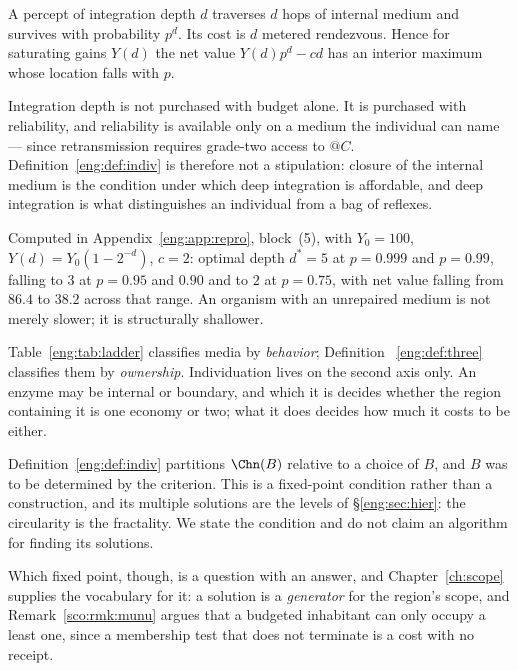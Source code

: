 \begin{proposition}
\label{eng:prop:fragile}
A percept of integration depth $d$ traverses $d$ hops of internal medium
and survives with probability $p^d$. Its cost is $d$ metered rendezvous.
Hence for saturating gains $Y(d)$ the net value $Y(d)p^d - cd$ has an
interior maximum whose location falls with $p$.
\end{proposition}

\begin{corollary}\label{eng:cor:owndepth}
Integration depth is not purchased with budget alone. It is purchased with
reliability, and reliability is available only on a medium the individual
can name --- since retransmission requires grade-two access to $@C$.
Definition~\ref{eng:def:indiv} is therefore not a stipulation: closure of the
internal medium is the condition under which deep integration is
affordable, and deep integration is what distinguishes an individual from a
bag of reflexes.
\end{corollary}

Computed in Appendix~\ref{eng:app:repro}, block~(5), with $Y_0 = 100$,
$Y(d) = Y_0(1-2^{-d})$, $c=2$: optimal depth $d^\ast = 5$ at $p = 0.999$
and $p=0.99$, falling to $3$ at $p = 0.95$ and $0.90$ and to $2$ at
$p = 0.75$, with net value falling from $86.4$ to $38.2$ across that range.
An organism with an unrepaired medium is not merely slower; it is
structurally shallower.

\begin{remark}\label{eng:two-axes}
Table~\ref{eng:tab:ladder} classifies media by \emph{behavior}; Definition~
\ref{eng:def:three} classifies them by \emph{ownership}. Individuation lives on
the second axis only. An enzyme may be internal or boundary, and which it
is decides whether the region containing it is one economy or two; what it
does decides how much it costs to be either.
\end{remark}

\begin{remark}\label{eng:rem:fixpoint}
Definition~\ref{eng:def:indiv} partitions $\Chn(B)$ relative to a choice of
$B$, and $B$ was to be determined by the criterion. This is a fixed-point
condition rather than a construction, and its multiple solutions are the
levels of \S\ref{eng:sec:hier}: the circularity is the fractality. We state the
condition and do not claim an algorithm for finding its solutions.

Which fixed point, though, is a question with an answer, and
Chapter~\ref{ch:scope} supplies the vocabulary for it: a solution is a
\emph{generator} for the region's scope, and
Remark~\ref{sco:rmk:munu} argues that a budgeted inhabitant can only
occupy a least one, since a membership test that does not terminate is
a cost with no receipt.
\end{remark}

